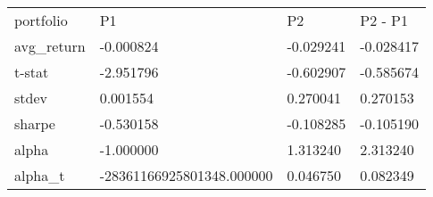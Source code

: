 \begin{tabular}{llll}
\toprule
\midrule
portfolio & P1 & P2 & P2 - P1 \\
avg_return & -0.000824 & -0.029241 & -0.028417 \\
t-stat & -2.951796 & -0.602907 & -0.585674 \\
stdev & 0.001554 & 0.270041 & 0.270153 \\
sharpe & -0.530158 & -0.108285 & -0.105190 \\
alpha & -1.000000 & 1.313240 & 2.313240 \\
alpha_t & -28361166925801348.000000 & 0.046750 & 0.082349 \\
\bottomrule
\end{tabular}
